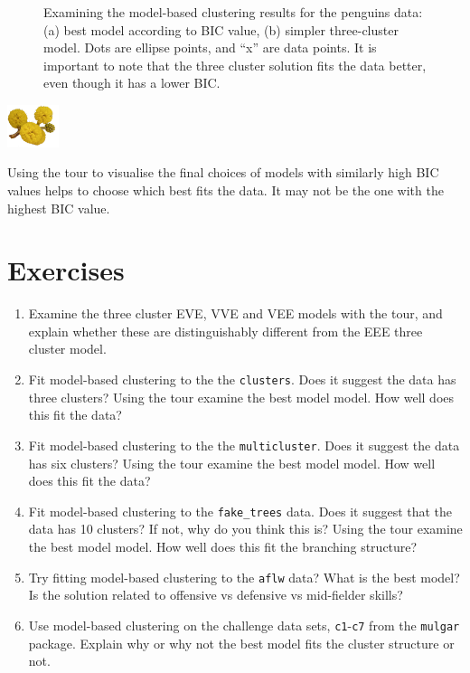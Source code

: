 \documentclass[
  letterpaper,
]{krantz}
\providecommand{\tightlist}{%
  \setlength{\itemsep}{0pt}\setlength{\parskip}{0pt}}\usepackage{longtable,booktabs,array}
\newcommand{\infobox}[1]{%
\noindent\colorbox{info!30}{%
\begin{minipage}{0.98\linewidth}%
    \centering%
    \begin{minipage}[c]{0.15\linewidth} %
      \includegraphics[width=1.5cm]{images/mulga-flowers2.png} %
    \end{minipage}%
    \hfill %
    \begin{minipage}[c]{0.8\linewidth} %
      \bigskip%
      \textsf{#1}%
      \bigskip%
    \end{minipage}%
    \hspace*{3mm}%
  \end{minipage}%
}%
}
\begin{document}
\begin{figure}
\begin{minipage}{0.50\linewidth}
{}


\end{minipage}%

\caption{\label{fig-penguins-mc-pdf}Examining the model-based clustering
results for the penguins data: (a) best model according to BIC value,
(b) simpler three-cluster model. Dots are ellipse points, and ``x'' are
data points. It is important to note that the three cluster solution
fits the data better, even though it has a lower BIC.}

\end{figure}%

\infobox{Using the tour to visualise the final choices of models with similarly high BIC values helps to choose which best fits the data. It may not be the one with the highest BIC value.}

\section*{Exercises}\label{exercises-9}


\begin{enumerate}
\def\labelenumi{\arabic{enumi}.}
\tightlist
\item
  Examine the three cluster EVE, VVE and VEE models with the tour, and
  explain whether these are distinguishably different from the EEE three
  cluster model.
\item
  Fit model-based clustering to the the \texttt{clusters}. Does it
  suggest the data has three clusters? Using the tour examine the best
  model model. How well does this fit the data?
\item
  Fit model-based clustering to the the \texttt{multicluster}. Does it
  suggest the data has six clusters? Using the tour examine the best
  model model. How well does this fit the data?
\item
  Fit model-based clustering to the \texttt{fake\_trees} data. Does it
  suggest that the data has 10 clusters? If not, why do you think this
  is? Using the tour examine the best model model. How well does this
  fit the branching structure?
\item
  Try fitting model-based clustering to the \texttt{aflw} data? What is
  the best model? Is the solution related to offensive vs defensive vs
  mid-fielder skills?
\item
  Use model-based clustering on the challenge data sets,
  \texttt{c1}-\texttt{c7} from the \texttt{mulgar} package. Explain why
  or why not the best model fits the cluster structure or not.
\end{enumerate}
\end{document}
